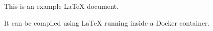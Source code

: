 \documentclass{article}
\begin{document}
  This is an example LaTeX document.

  It can be compiled using LaTeX running inside a Docker container.
\end{document}
